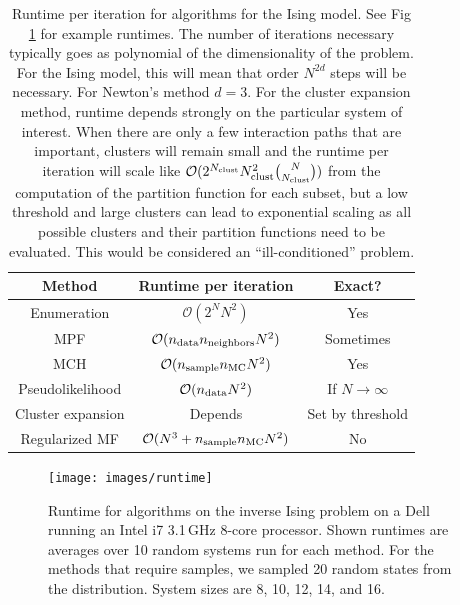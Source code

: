 \documentclass[aps,prl,twocolumn]{revtex4-1}
\begin{document}
\begin{table}[bt]
\begin{center}
\begin{tabular}{|c|c|c|}
\hline
	Method 	& Runtime per iteration & Exact? \\
\hline
	Enumeration 		& $\mathcal{O}(2^N N^2)$ & Yes\\
	MPF					& $\mathcal{O}(n_{\rm data}n_{\rm neighbors}N^2)$ & Sometimes\\
	MCH 				& $\mathcal{O}(n_{\rm sample}n_{\rm MC}N^2)$ & Yes\\
	Pseudolikelihood 	& $\mathcal{O}(n_{\rm data}N^2)$ & If $N\rightarrow\infty$\\
	Cluster expansion 	& Depends & Set by threshold\\
	Regularized MF & $\mathcal{O}(N^3 + n_{\rm sample}n_{\rm MC}N^2)$ & No\\
\hline
\end{tabular}
\caption{Runtime per iteration for algorithms for the Ising model. See Fig \ref{gr:runtime} for example runtimes. 
The number of iterations necessary typically goes as polynomial of the dimensionality of the problem. For the Ising model, this will mean that order $N^{2d}$ steps will be necessary. For Newton's method $d=3$.
For the cluster expansion method, runtime depends strongly on the particular system of interest. When there are only a few interaction paths that are important, clusters will remain small and the runtime per iteration will scale like $\mathcal{O}(2^{N_{\rm clust}}N_{\rm clust}^2\binom{N}{N_{\rm clust}})$ from the computation of the partition function for each subset, but a low threshold and large clusters can lead to exponential scaling as all possible clusters and their partition functions need to be evaluated. This would be considered an ``ill-conditioned'' problem.}\label{tb:runtime}
\end{center}
\end{table}%

\begin{figure}[tb]\centering
	\texttt{[image: images/runtime]}
\caption{Runtime for algorithms on the inverse Ising problem on a Dell running an Intel i7 3.1\,GHz 8-core processor. Shown runtimes are averages over 10 random systems run for each method. For the methods that require samples, we sampled 20 random states from the distribution. System sizes are 8, 10, 12, 14, and 16.}
\label{gr:runtime}
\end{figure}
\end{document}
